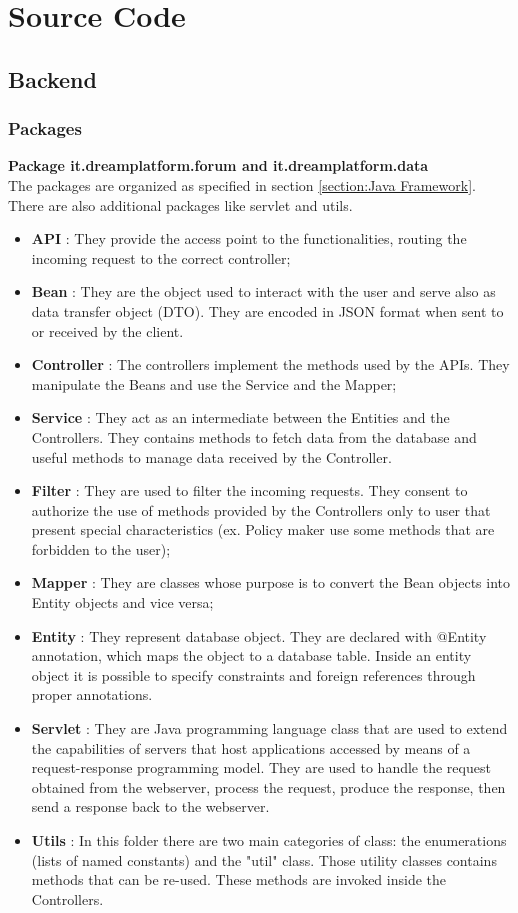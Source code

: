 \section{Source Code}

\subsection{Backend}
\subsubsection{Packages}


\textbf{Package it.dreamplatform.forum and it.dreamplatform.data}\\
The packages are organized as specified in section \ref{section:Java Framework}. There are also additional packages like servlet and utils.\\
\begin{itemize}
    \item \textbf{API} : They provide the access point to the functionalities, routing the incoming request to the correct controller;
    \item \textbf{Bean} : They are the object used to interact with the user and serve also as data transfer object (DTO). They are encoded in JSON format when sent to or received by the client.
    \item \textbf{Controller} : The controllers implement the methods used by the APIs. They manipulate the Beans and use the Service and the Mapper;
    \item \textbf{Service} : They act as an intermediate between the Entities and the Controllers. They contains methods to fetch data from the database and useful methods to manage data received by the Controller.
    \item \textbf{Filter} : They are used to filter the incoming requests. They consent to authorize the use of methods provided by the Controllers only to user that present special characteristics (ex. Policy maker use some methods that are forbidden to the user);
    \item \textbf{Mapper} : They are classes whose purpose is to convert the Bean objects into Entity objects and vice versa;
    \item \textbf{Entity} : They represent database object. They are declared with @Entity annotation, which maps the object to a database table. Inside an entity object it is possible to specify constraints and foreign references through proper annotations.
    \item \textbf{Servlet} : They are Java programming language class that are used to extend the capabilities of servers that host applications accessed by means of a request-response programming model. They are used to handle the request obtained from the webserver, process the request, produce the response, then send a response back to the webserver. 
    \item \textbf{Utils} : In this folder there are two main categories of class: the enumerations (lists of named constants) and the "util" class. Those utility classes contains methods that can be re-used. These methods are invoked inside the Controllers. 
\end{itemize}


